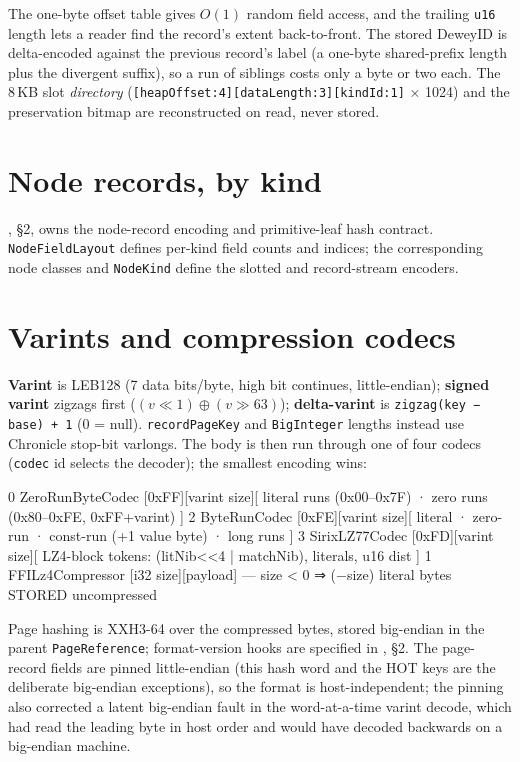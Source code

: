\documentclass[11pt,a4paper,oneside]{report}
\theoremstyle{sirixthm}
\newcommand{\code}[1]{\texttt{#1}}
\begin{document}
\noindent The one-byte offset table gives $O(1)$ random field access, and the trailing \code{u16} length
lets a reader find the record's extent back-to-front. The stored DeweyID is delta-encoded against the
previous record's label (a one-byte shared-prefix length plus the divergent suffix), so a run of
siblings costs only a byte or two each. The 8\,KB slot \emph{directory}
(\code{[heapOffset:4][dataLength:3][kindId:1]} $\times$ 1024) and the preservation bitmap are
reconstructed on read, never stored.

\section{Node records, by kind}

, \S2, owns the node-record encoding and primitive-leaf hash contract.
\code{NodeFieldLayout} defines per-kind field counts and indices; the corresponding node classes
and \code{NodeKind} define the slotted and record-stream encoders.

\section{Varints and compression codecs}

\textbf{Varint} is LEB128 (7 data bits/byte, high bit continues, little-endian); \textbf{signed varint}
zigzags first ($(v\!\ll\!1)\oplus(v\!\gg\!63)$); \textbf{delta-varint} is \code{zigzag(key − base) + 1}
(0 = null). \code{recordPageKey} and \code{BigInteger} lengths instead use Chronicle stop-bit varlongs.
The body is then run through one of four codecs (\code{codec} id selects the decoder); the smallest
encoding wins:

\begin{diagramS}
0 ZeroRunByteCodec   [0xFF][varint size][ literal runs (0x00–0x7F) · zero runs (0x80–0xFE, 0xFF+varint) ]
2 ByteRunCodec       [0xFE][varint size][ literal · zero-run · const-run (+1 value byte) · long runs ]
3 SirixLZ77Codec     [0xFD][varint size][ LZ4-block tokens: (litNib<<4 | matchNib), literals, u16 dist ]
1 FFILz4Compressor   [i32 size][payload]   — size < 0 ⇒ (−size) literal bytes STORED uncompressed
\end{diagramS}

\noindent Page hashing is XXH3-64 over the compressed bytes, stored big-endian in the parent
\code{PageReference}; format-version hooks are specified in , \S2. The page-record fields
are pinned little-endian (this hash word and the HOT keys are the deliberate big-endian exceptions), so
the format is host-independent; the pinning also corrected a latent big-endian fault in the
word-at-a-time varint decode, which had read the leading byte in host order and would have decoded
backwards on a big-endian machine.
\end{document}

